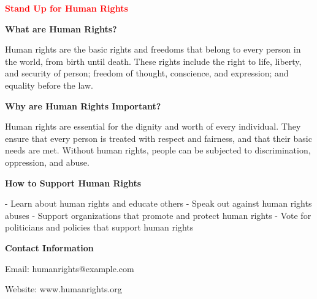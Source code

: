 \documentclass[11pt]{article}
\begin{document}
\begin{center}

\vspace{1cm}

{\Large\textbf{\textcolor{red}{Stand Up for Human Rights}}}

\vspace{0.5cm}

{\large\textbf{What are Human Rights?}}

\vspace{0.5cm}

Human rights are the basic rights and freedoms that belong to every person in the world, from birth until death. These rights include the right to life, liberty, and security of person; freedom of thought, conscience, and expression; and equality before the law.

\vspace{1cm}

{\large\textbf{Why are Human Rights Important?}}

\vspace{0.5cm}

Human rights are essential for the dignity and worth of every individual. They ensure that every person is treated with respect and fairness, and that their basic needs are met. Without human rights, people can be subjected to discrimination, oppression, and abuse.

\vspace{1cm}

{\large\textbf{How to Support Human Rights}}

\vspace{0.5cm}

- Learn about human rights and educate others
- Speak out against human rights abuses
- Support organizations that promote and protect human rights
- Vote for politicians and policies that support human rights

\vspace{1cm}

{\large\textbf{Contact Information}}

\vspace{0.5cm}

Email: humanrights@example.com

Website: www.humanrights.org

\end{center}
\end{document}
